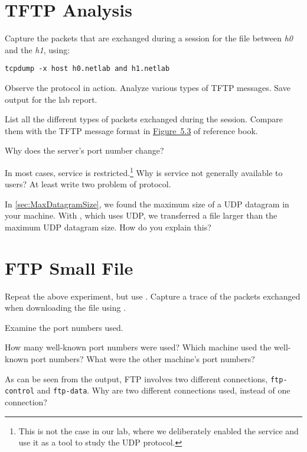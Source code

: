 \documentclass{../UTNetLab}
\begin{document}
\section{TFTP Analysis}
Capture the packets that are exchanged during a  session for the  file between \textit{h0} and the \textit{h1}, using:
\begin{lstlisting}[emph={h0,h1,netlab},morekeywords={[3]host,and}]
tcpdump -x host h0.netlab and h1.netlab
    \end{lstlisting}
Observe the protocol in action.
Analyze various types of TFTP messages.
Save  output for the lab report.

\begin{report}
    \item List all the different types of packets exchanged during the  session.
    Compare them with the TFTP message format in \hyperref[fig:5.3]{Figure~5.3} of reference book.

    Why does the server’s port number change?

    \item In most cases,  service is restricted.\footnote{This is not the case in our lab, where we deliberately enabled the  service and use it as a tool to study the UDP protocol.}
    Why is  service not generally available to users? At least write two problem of  protocol.

    \item In \autoref{sec:MaxDatagramSize}, we found the maximum size of a UDP datagram in your machine.
    With , which uses UDP, we transferred a file larger than the maximum UDP datagram size.
    How do you explain this?
\end{report}

\section{FTP Small File}
Repeat the above experiment, but use .
Capture a trace of the packets exchanged when downloading the  file using .

Examine the port numbers used.

\begin{report}
    \item How many well-known port numbers were used?
    Which machine used the well-known port numbers?
    What were the other machine’s port numbers?

    \item As can be seen from the  output, FTP involves two different connections, \texttt{ftp-control} and \texttt{ftp-data}.
    Why are two different connections used, instead of one connection?
\end{report}
\end{document}
